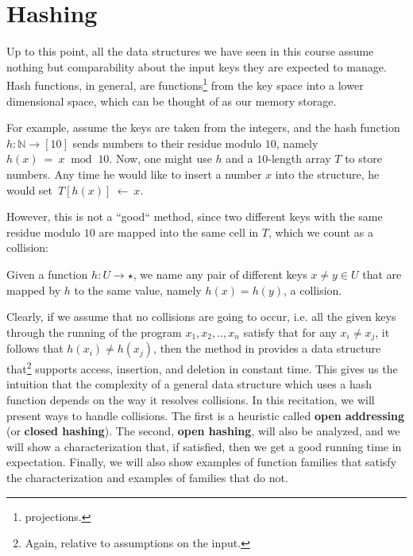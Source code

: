 

\newcommand{\image}{\text{ Im } }



\ifdefined\BOOK
\else
\setcounter{chapter}{8}
\fi

\chapter{Hashing}
Up to this point, all the data structures we have seen in this course assume nothing but comparability about the input keys they are expected to manage. Hash functions, in general, are functions\footnote{projections.} from the key space into a lower dimensional space, which can be thought of as our memory storage. 
\begin{example}
  \label{example:bad}
For example, assume the keys are taken from the integers, and the hash function $h : \mathbb{N} \rightarrow [10]$ sends numbers to their residue modulo $10$, namely $h(x)~=~x~\text{ mod }~10$. Now, one might use $h$ and a $10$-length array $T$ to store numbers. Any time he would like to insert a number $x$ into the structure, he would set~$T[h(x)]~\leftarrow~x$. 
\end{example}
However, this is not a ``good`` method, since two different keys with the same residue modulo $10$ are mapped into the same cell in $T$, which we count as a collision:  
\begin{definition}[collision.]
  Given a function $h : U \rightarrow \star$, we name any pair of different keys $x\neq y \in U$ that are mapped by $h$ to the same value, namely $h(x) = h(y)$, a collision.
\end{definition}
Clearly, if we assume that no collisions are going to occur, i.e. all the given keys through the running of the program $x_{1},x_{2},..,x_{n}$ satisfy that for any $x_{i}\neq x_j$, it follows that $h(x_{i}) \neq h(x_{j})$, then the method in  provides a data structure that\footnote{Again, relative to assumptions on the input.} supports access, insertion, and deletion in constant time. This gives us the intuition that the complexity of a general data structure which uses a hash function depends on the way it resolves collisions. In this recitation, we will present ways to handle collisions. The first is a heuristic called \textbf{open addressing} (or \textbf{closed hashing}). The second, \textbf{open hashing}, will also be analyzed, and we will show a characterization that, if satisfied, then we get a good running time in expectation. Finally, we will also show examples of function families that satisfy the characterization and examples of families that do not.


